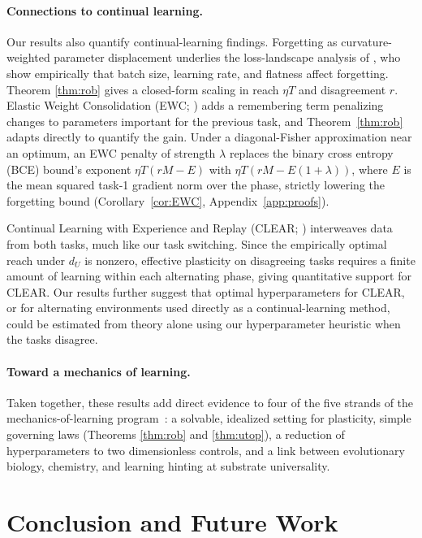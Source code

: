 \documentclass[pmlr]{jmlr} %
\begin{document}
\paragraph{Connections to continual learning.} Our results also quantify continual-learning findings. Forgetting as curvature-weighted parameter displacement underlies the loss-landscape analysis of \citet{connectforget21}, who show empirically that batch size, learning rate, and flatness affect forgetting. Theorem \ref{thm:rob} gives a closed-form scaling in reach $\eta T$ and disagreement $r$. Elastic Weight Consolidation (EWC; \citealp{forgetting17}) adds a remembering term penalizing changes to parameters important for the previous task, and Theorem~\ref{thm:rob} adapts directly to quantify the gain. Under a diagonal-Fisher approximation near an optimum, an EWC penalty of strength $\lambda$ replaces the binary cross entropy (BCE) bound's exponent $\eta T(rM - E)$ with $\eta T(rM - E(1+\lambda))$, where $E$ is the mean squared task-1 gradient norm over the phase, strictly lowering the forgetting bound (Corollary~\ref{cor:EWC}, Appendix~\ref{app:proofs}).

Continual Learning with Experience and Replay (CLEAR; \citealp{reaplay18}) interweaves data from both tasks, much like our task switching. Since the empirically optimal reach under $d_U$ is nonzero, effective plasticity on disagreeing tasks requires a finite amount of learning within each alternating phase, giving quantitative support for CLEAR. Our results further suggest that optimal hyperparameters for CLEAR, or for alternating environments used directly as a continual-learning method, could be estimated from theory alone using our hyperparameter heuristic when the tasks disagree.

\paragraph{Toward a mechanics of learning.} Taken together, these results add direct evidence to four of the five strands of the mechanics-of-learning program~\citep{learningmech26}: a solvable, idealized setting for plasticity, simple governing laws (Theorems \ref{thm:rob} and \ref{thm:utop}), a reduction of hyperparameters to two dimensionless controls, and a link between evolutionary biology, chemistry, and learning hinting at substrate universality.

\section{Conclusion and Future Work}
\end{document}
